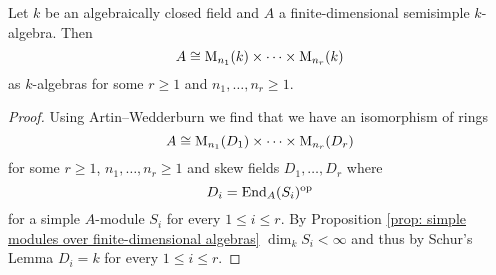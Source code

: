 \begin{cor}\label{cor: semisimple algebra product of matrix algebras over field}
  Let $k$ be an algebraically closed field and $A$ a finite-dimensional semisimple $k$-algebra.
  Then
  \[
    A \cong \operatorname{M}_{n_1}(k) \times \dotsm \times \operatorname{M}_{n_r}(k)
  \]
  as $k$-algebras for some $r \geq 1$ and $n_1, \dotsc, n_r \geq 1$.
\end{cor}
\begin{proof}
  Using Artin--Wedderburn we find that we have an isomorphism of rings
  \[
    A \cong \operatorname{M}_{n_1}(D_1) \times \dotsm \times \operatorname{M}_{n_r}(D_r)
  \]
  for some $r \geq 1$, $n_1, \dotsc, n_r \geq 1$ and skew fields $D_1, \dotsc, D_r$ where
  \[
    D_i = \operatorname{End}_A(S_i)^{\mathrm{op}}
  \]
  for a simple $A$-module $S_i$ for every $1 \leq i \leq r$.
  By Proposition \ref{prop: simple modules over finite-dimensional algebras} $\dim_k S_i < \infty$ and thus by Schur’s Lemma $D_i = k$ for every $1 \leq i \leq r$.
\end{proof}


